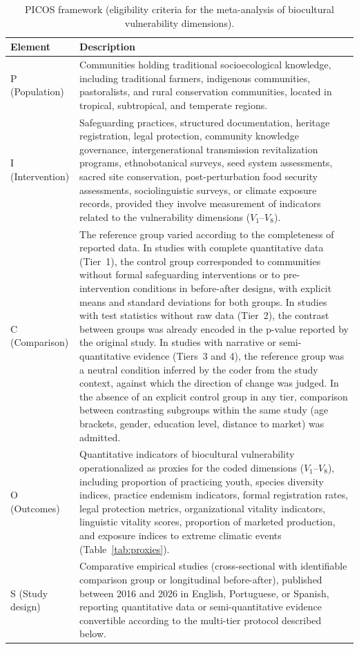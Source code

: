 \documentclass[12pt,a4paper]{article}
\begin{document}
\begin{table}[htbp]
\caption{PICOS framework (eligibility criteria for the meta-analysis of biocultural vulnerability dimensions).}
\label{tab:picos}
\centering
\small
\begin{tabular}{p{3.5cm} p{9.5cm}}
\toprule
\textbf{Element} & \textbf{Description} \\
\midrule
P (Population) & Communities holding traditional socioecological knowledge, including traditional farmers, indigenous communities, pastoralists, and rural conservation communities, located in tropical, subtropical, and temperate regions. \\
I (Intervention) & Safeguarding practices, structured documentation, heritage registration, legal protection, community knowledge governance, intergenerational transmission revitalization programs, ethnobotanical surveys, seed system assessments, sacred site conservation, post-perturbation food security assessments, sociolinguistic surveys, or climate exposure records, provided they involve measurement of indicators related to the vulnerability dimensions ($V_1$--$V_8$). \\
C (Comparison) & The reference group varied according to the completeness of reported data. In studies with complete quantitative data (Tier~1), the control group corresponded to communities without formal safeguarding interventions or to pre-intervention conditions in before-after designs, with explicit means and standard deviations for both groups. In studies with test statistics without raw data (Tier~2), the contrast between groups was already encoded in the p-value reported by the original study. In studies with narrative or semi-quantitative evidence (Tiers~3 and 4), the reference group was a neutral condition inferred by the coder from the study context, against which the direction of change was judged. In the absence of an explicit control group in any tier, comparison between contrasting subgroups within the same study (age brackets, gender, education level, distance to market) was admitted. \\
O (Outcomes) & Quantitative indicators of biocultural vulnerability operationalized as proxies for the coded dimensions ($V_1$--$V_8$), including proportion of practicing youth, species diversity indices, practice endemism indicators, formal registration rates, legal protection metrics, organizational vitality indicators, linguistic vitality scores, proportion of marketed production, and exposure indices to extreme climatic events (Table~\ref{tab:proxies}). \\
S (Study design) & Comparative empirical studies (cross-sectional with identifiable comparison group or longitudinal before-after), published between 2016 and 2026 in English, Portuguese, or Spanish, reporting quantitative data or semi-quantitative evidence convertible according to the multi-tier protocol described below. \\
\bottomrule
\end{tabular}
\end{table}
\end{document}
